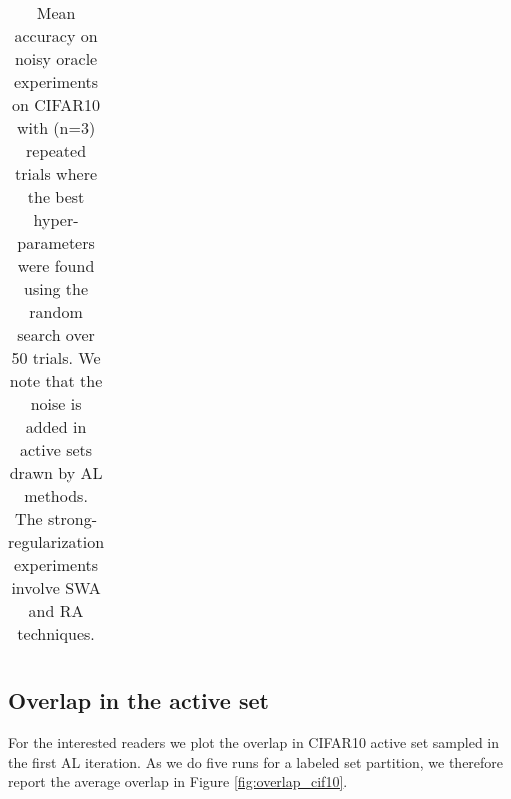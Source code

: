 \documentclass[10pt,twocolumn,letterpaper]{article}
\begin{document}
\begin{table*}[h]
\begin{tabular}{l|cccc|cccc}
\bottomrule
\end{tabular}

\caption{Mean accuracy on noisy oracle experiments on CIFAR10 with (n=3) repeated trials where the best hyper-parameters were found using the random search over 50 trials. We note that the noise is added in active sets drawn by AL methods. The strong-regularization experiments involve SWA and RA techniques.}
\label{tab:noisy_oracle}
\end{table*}

\subsection{Overlap in the active set}
\label{supp:section_overlap_active_set}
For the interested readers we plot the overlap in CIFAR10 active set sampled in the first AL iteration. As we do five runs for a labeled set partition, we therefore report the average overlap in Figure \ref{fig:overlap_cif10}.
\end{document}
